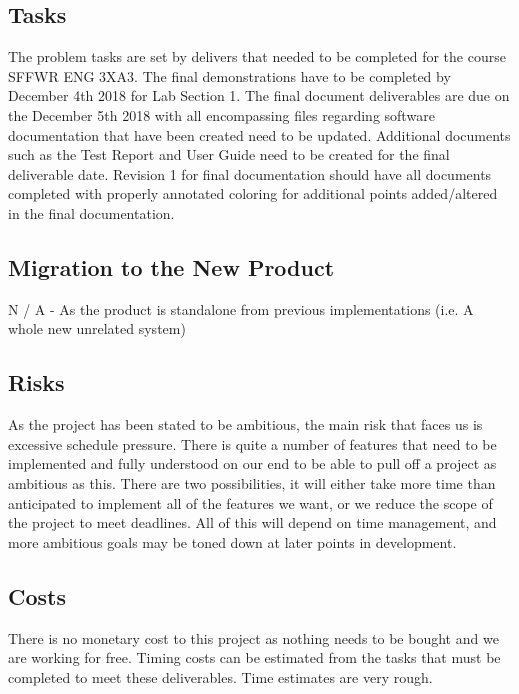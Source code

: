 \documentclass[12pt, titlepage]{article}
\begin{document}
\subsection{Tasks}
{\color{blue} The problem tasks are set by delivers that needed to be completed for the course SFFWR ENG 3XA3. The final demonstrations have to be completed by December 4th 2018 for Lab Section 1. The final document deliverables are due on the December 5th 2018 with all encompassing files regarding software documentation that have been created need to be updated. Additional documents such as the Test Report and User Guide need to be created for the final deliverable date. Revision 1 for final documentation should have all documents completed with properly annotated coloring for additional points added/altered in the final documentation.}


\subsection{Migration to the New Product}

N / A - As the product is standalone from previous implementations (i.e. A whole new unrelated system)

\subsection{Risks}

As the project has been stated to be ambitious, the main risk that faces us is excessive schedule pressure. There is quite a number of features that need to be implemented and fully understood on our end to be able to pull off a project as ambitious as this. There are two possibilities, it will either take more time than anticipated to implement all of the features we want, or we reduce the scope of the project to meet deadlines. All of this will depend on time management, and more ambitious goals may be toned down at later points in development.

\subsection{Costs}

There is no monetary cost to this project as nothing needs to be bought and we are working for free. Timing costs can be estimated from the tasks that must be completed to meet these deliverables. Time estimates are very rough.
\end{document}
